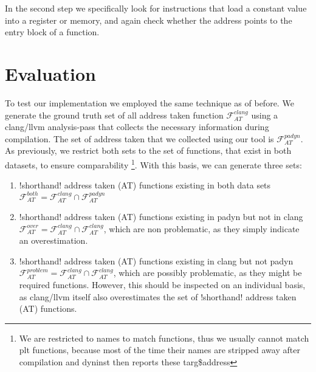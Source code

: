 In the second step we specifically look for instructions that load a constant value into a register or memory, and again check whether the address points to the entry block of a function.

\section{Evaluation}
To test our implementation we employed the same technique as of before. We generate the ground truth set of all address taken function $\mathcal{F}^{clang}_{AT}$ using a clang/llvm analysis-pass that collects the necessary information during compilation. The set of address taken that we collected using our tool is  $\mathcal{F}^{padyn}_{AT}$. As previously, we restrict both sets to the set of functions, that exist in both datasets, to ensure comparability \footnote{We are restricted to names to match functions, thus we usually cannot match plt functions, because most of the time their names are stripped away after compilation and dyninst then reports these targ\${address} }. With this basis, we can generate three sets:
\begin{enumerate}
\item {!shorthand! address taken (AT)} functions existing in both data sets $\mathcal{F}^{both}_{AT} = \mathcal{F}^{clang}_{AT} \cap \mathcal{F}^{padyn}_{AT}$
\item {!shorthand! address taken (AT)} functions existing in padyn but not in clang $\mathcal{F}^{over}_{AT} = \mathcal{F}^{clang}_{AT} \cap \mathcal{F}^{clang}_{AT}$, which are non problematic, as they simply indicate an overestimation.
\item {!shorthand! address taken (AT)} functions existing in clang but not padyn $\mathcal{F}^{problem}_{AT} = \mathcal{F}^{clang}_{AT} \cap \mathcal{F}^{clang}_{AT}$, which are possibly problematic, as they might be required functions. However, this should be inspected on an individual basis, as clang/llvm itself also overestimates the set of {!shorthand! address taken (AT)} functions.
\end{enumerate}

